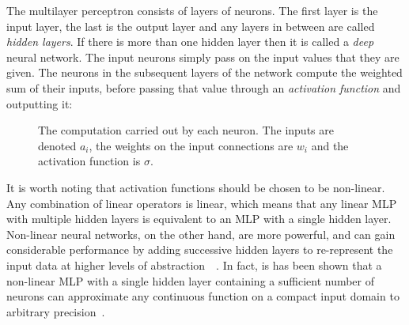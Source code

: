 \documentclass[a4paper, 12pt]{report}
\newcommand{\tit}[1]{\textit{#1}}
\begin{document}
The multilayer perceptron consists of layers of neurons. The first layer is the input layer, the last is the output layer and any layers in between are called \tit{hidden layers}. If there is more than one hidden layer then it is called a \tit{deep} neural network. The input neurons simply pass on the input values that they are given. The neurons in the subsequent layers of the network compute the weighted sum of their inputs, before passing that value through an \tit{activation function} and outputting it:

\begin{figure}[h]
\captionsetup{justification=centering}
\begin{center}
\caption{The computation carried out by each neuron. The inputs are denoted $a_i$, the weights on the input connections are $w_i$ and the activation function is $\sigma$.}
\end{center}
\end{figure}

It is worth noting that activation functions should be chosen to be non-linear. Any combination of linear operators is linear, which means that any linear MLP with multiple hidden layers is equivalent to an MLP with a single hidden layer. Non-linear neural networks, on the other hand, are more powerful, and can gain considerable performance by adding successive hidden layers to re-represent the input data at higher levels of abstraction~\cite{dbn:hinton2006}~\cite{scaling:bengio2007}. In fact, is has been shown that a non-linear MLP with a single hidden layer containing a sufficient number of neurons can approximate any continuous function on a compact input domain to arbitrary precision~\cite{universal_approximators:hornik1989}. \\
\end{document}
